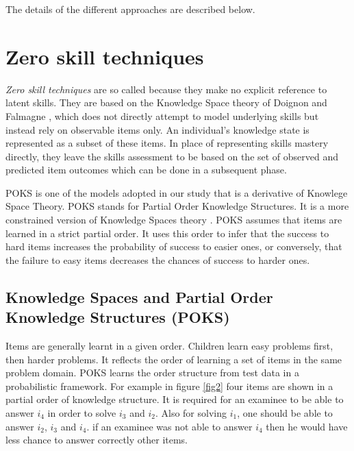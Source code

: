 The details of the different approaches are described below.

\section{Zero skill techniques}

\textit{Zero skill techniques} are so called because they make no explicit reference to latent skills.  They are based on the Knowledge Space theory of Doignon and Falmagne \citep{Doignon1999,desmarais:umuai:2006}, which does not directly attempt to model underlying skills but instead rely on observable items only.  An individual's knowledge state is represented as a subset of these items. In place of representing skills mastery directly, they leave the skills assessment to be based on the set of observed and predicted item outcomes which can be done in a subsequent phase. 

POKS is one of the models adopted in our study that is a derivative of Knowlege Space Theory.  POKS stands for Partial Order Knowledge Structures.  It is a more constrained version of Knowledge Spaces theory \citep{desmarais:umuai:1995}.  POKS assumes that items are learned in a strict partial order.  It uses this order to infer that the success to hard items increases the probability of success to easier ones, or conversely, that the failure to easy items decreases the chances of success to harder ones.

\subsection{Knowledge Spaces and Partial Order Knowledge Structures (POKS)}

Items are generally learnt in a given order. Children learn easy problems first, then harder problems. It reflects the order of learning a set of items in the same problem domain. POKS learns the order structure from test data in a probabilistic framework. For example in figure \ref{fig2} four items are shown in a partial order of knowledge structure. It is required for an examinee to be able to answer $i_{4}$ in order to solve $i_{3}$ and $i_{2}$. Also for solving $i_{1}$, one should be able to answer $i_{2}$, $i_{3}$ and $i_{4}$. if an examinee was not able to answer $i_{4}$ then he would have less chance to answer correctly other items.

